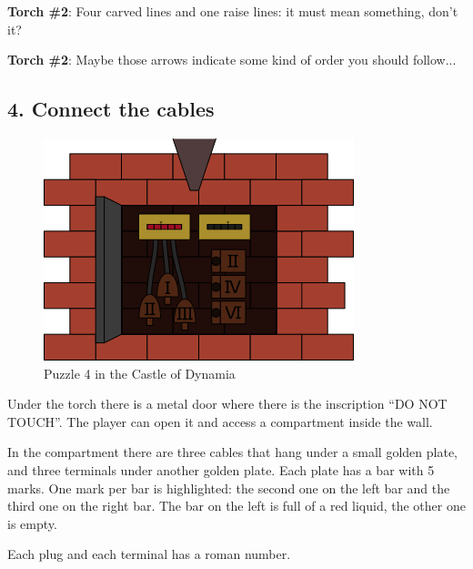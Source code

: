 \textbf{Torch \#{}2}: Four carved lines and one raise lines: it must mean something, don't it?

\textbf{Torch \#{}2}: Maybe those arrows indicate some kind of order you should follow...



\subsection{4. Connect the cables}

\begin{figure}[H]
  \centering
  \includegraphics[width=\textwidth]{Images/Puzzles/castleOfDynamia4}
  \caption{Puzzle 4 in the Castle of Dynamia}
\end{figure}


Under the torch there is a metal door where there is the inscription \enquote{DO NOT TOUCH}. The player can open it and access a compartment inside the wall.

In the compartment there are three cables that hang under a small golden plate, and three terminals under another golden plate. Each plate has a bar with 5 marks. One mark per bar is highlighted: the second one on the left bar and the third one on the right bar. The bar on the left is full of a red liquid, the other one is empty.

Each plug and each terminal has a roman number.

